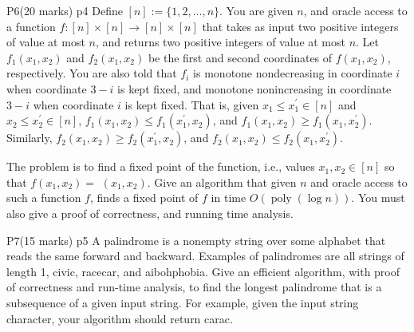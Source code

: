 \documentclass[a4paper, 11pt]{article}
\begin{document}
\begin{problem}{%
		P6\hfill  (20 marks)
	}{p4%
	}
	Define $[n]:=\{1,2, \ldots, n\}$. You are given $n$, and oracle access to a function $f:[n] \times[n] \rightarrow[n] \times[n]$ that takes as input two positive integers of value at most $n$, and returns two positive integers of value at most $n$. Let $f_1\left(x_1, x_2\right)$ and $f_2\left(x_1, x_2\right)$ be the first and second coordinates of $f\left(x_1, x_2\right)$, respectively. You are also told that $f_i$ is monotone nondecreasing in coordinate $i$ when coordinate $3-i$ is kept fixed, and monotone nonincreasing in coordinate $3-i$ when coordinate $i$ is kept fixed. That is, given $x_1 \leq x_1^{\prime} \in[n]$ and $x_2 \leq x_2^{\prime} \in[n]$, $f_1\left(x_1, x_2\right) \leq f_1\left(x_1^{\prime}, x_2\right)$, and $f_1\left(x_1, x_2\right) \geq f_1\left(x_1, x_2^{\prime}\right)$. Similarly, $f_2\left(x_1, x_2\right) \geq f_2\left(x_1^{\prime}, x_2\right)$, and $f_2\left(x_1, x_2\right) \leq f_2\left(x_1, x_2^{\prime}\right)$.\parinn
	
	The problem is to find a fixed point of the function, i.e., values $x_1, x_2 \in[n]$ so that $f\left(x_1, x_2\right)=$ $\left(x_1, x_2\right)$. Give an algorithm that given $n$ and oracle access to such a function $f$, finds a fixed point of $f$ in time $O(\operatorname{poly}(\log n))$. You must also give a proof of correctness, and running time analysis.
\end{problem}
\solve{
	
}

\begin{problem}{%
	P7\hfill  (15 marks)
}{p5%
}
A palindrome is a nonempty string over some alphabet that reads the same forward and backward. Examples of palindromes are all strings of length 1, civic, racecar, and aibohphobia. Give an efficient algorithm, with proof of correctness and run-time analysis, to find the longest palindrome that is a subsequence of a given input string. For example, given the input string character, your algorithm should return carac.
\end{problem}
\solve{

}
\end{document}
